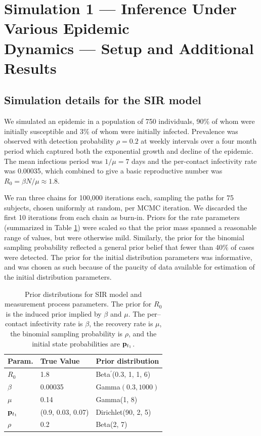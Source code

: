 \section{Simulation 1 --- Inference Under Various Epidemic\\ Dynamics --- Setup and Additional Results}
\label{sec:bda_sim1_details}
\subsection{Simulation details for the SIR model}
We simulated an epidemic in a population of 750 individuals, 90\% of whom were initially susceptible and 3\% of whom were initially infected. Prevalence was observed with detection probability $ \rho=0.2 $ at weekly intervals over a four month period which captured both the exponential growth and decline of the epidemic. The mean infectious period was $ 1/\mu = 7 $ days and the per-contact infectivity rate was 0.00035, which combined to give a basic reproductive number was $ R_0 = \beta N /\mu \approx 1.8$.

We ran three chains for 100,000 iterations each, sampling the paths for 75 subjects, chosen uniformly at random, per MCMC iteration. We discarded the first 10 iterations from each chain as burn-in. Priors for the rate parameters (summarized in Table \ref{tab:sim1_sir_priors}) were scaled so that the prior mass spanned a reasonable range of values, but were otherwise mild. Similarly, the prior for the binomial sampling probability reflected a general prior belief that fewer than 40\% of cases were detected. The prior for the initial distribution parameters was informative, and was chosen as such because of the paucity of data available for estimation of the initial distribution parameters.

\begin{table}[htbp]
	\centering
	\begin{tabular}{lll}
		\hline
		Param. & True Value & Prior distribution \\ 
		\hline
		$ R_0 $ & 1.8 & Beta$ ^\prime $(0.3, 1, 1, 6) \\
		$ \beta $ & 0.00035 & Gamma$ (0.3, 1000) $ \\ 
		$ \mu $ & 0.14 & Gamma(1, 8)  \\ 
		$ \mathbf{p}_{t_1} $ & (0.9, 0.03, 0.07) & Dirichlet(90, 2, 5)  \\ 
		$ \rho $ & 0.2 & Beta(2, 7) \\
		\hline
	\end{tabular}
	\caption{Prior distributions for SIR model and measurement process parameters. The prior for $ R_0 $ is the induced prior implied by $ \beta $ and $ \mu $. The per--contact infectivity rate is $ \beta $, the recovery rate is $ \mu $, the binomial sampling probability is $ \rho $, and the initial state probabilities are $ \mathbf{p}_{t_1} $.}
	\label{tab:sim1_sir_priors}
\end{table}


